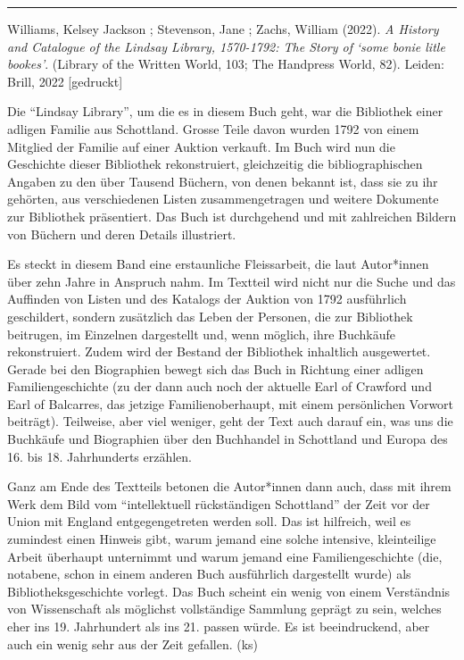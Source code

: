 \documentclass[a4paper,
fontsize=11pt,
oneside,
numbers=noperiodatend,
parskip=half-,
bibliography=totoc,
final
]{scrartcl}
\begin{document}
\begin{center}\rule{0.5\linewidth}{0.5pt}\end{center}

Williams, Kelsey Jackson ; Stevenson, Jane ; Zachs, William (2022).
\emph{A History and Catalogue of the Lindsay Library, 1570-1792: The
Story of} \emph{\enquote*{some bonie litle bookes}}. (Library of the
Written World, 103; The Handpress World, 82). Leiden: Brill, 2022
{[}gedruckt{]}

Die \enquote{Lindsay Library}, um die es in diesem Buch geht, war die
Bibliothek einer adligen Familie aus Schottland. Grosse Teile davon
wurden 1792 von einem Mitglied der Familie auf einer Auktion verkauft.
Im Buch wird nun die Geschichte dieser Bibliothek rekonstruiert,
gleichzeitig die bibliographischen Angaben zu den über Tausend Büchern,
von denen bekannt ist, dass sie zu ihr gehörten, aus verschiedenen
Listen zusammengetragen und weitere Dokumente zur Bibliothek
präsentiert. Das Buch ist durchgehend und mit zahlreichen Bildern von
Büchern und deren Details illustriert.

Es steckt in diesem Band eine erstaunliche Fleissarbeit, die laut
Autor*innen über zehn Jahre in Anspruch nahm. Im Textteil wird nicht nur
die Suche und das Auffinden von Listen und des Katalogs der Auktion von
1792 ausführlich geschildert, sondern zusätzlich das Leben der Personen,
die zur Bibliothek beitrugen, im Einzelnen dargestellt und, wenn
möglich, ihre Buchkäufe rekonstruiert. Zudem wird der Bestand der
Bibliothek inhaltlich ausgewertet. Gerade bei den Biographien bewegt
sich das Buch in Richtung einer adligen Familiengeschichte (zu der dann
auch noch der aktuelle Earl of Crawford und Earl of Balcarres, das
jetzige Familienoberhaupt, mit einem persönlichen Vorwort beiträgt).
Teilweise, aber viel weniger, geht der Text auch darauf ein, was uns die
Buchkäufe und Biographien über den Buchhandel in Schottland und Europa
des 16. bis 18. Jahrhunderts erzählen.

Ganz am Ende des Textteils betonen die Autor*innen dann auch, dass mit
ihrem Werk dem Bild vom \enquote{intellektuell rückständigen Schottland}
der Zeit vor der Union mit England entgegengetreten werden soll. Das ist
hilfreich, weil es zumindest einen Hinweis gibt, warum jemand eine
solche intensive, kleinteilige Arbeit überhaupt unternimmt und warum
jemand eine Familiengeschichte (die, notabene, schon in einem anderen
Buch ausführlich dargestellt wurde) als Bibliotheksgeschichte vorlegt.
Das Buch scheint ein wenig von einem Verständnis von Wissenschaft als
möglichst vollständige Sammlung geprägt zu sein, welches eher ins 19.
Jahrhundert als ins 21. passen würde. Es ist beeindruckend, aber auch
ein wenig sehr aus der Zeit gefallen. (ks)
\end{document}
